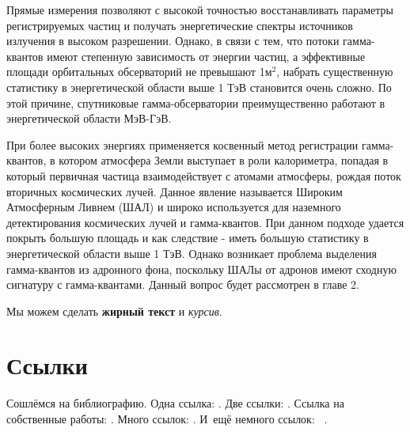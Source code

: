 Прямые измерения позволяют с высокой точностью восстанавливать параметры регистрируемых частиц и получать энергетические спектры источников излучения в высоком разрешении. Однако, в связи с тем, что потоки гамма-квантов имеют степенную зависимость от энергии частиц, а эффективные площади орбитальных обсерваторий не превышают 1$м^2$, набрать существенную статистику в энергетической области выше 1 ТэВ становится очень сложно. По этой причине, спутниковые гамма-обсерватории преимущественно работают в энергетической области МэВ-ГэВ. 

При более высоких энергиях применяется косвенный метод регистрации гамма-квантов, в котором атмосфера Земли выступает в роли калориметра, попадая в который первичная частица взаимодействует с атомами атмосферы, рождая поток вторичных космических лучей. Данное явление называется Широким Атмосферным Ливнем (ШАЛ) и широко используется для наземного детектирования космических лучей и гамма-квантов. При данном подходе удается покрыть большую площадь и как следствие - иметь большую статистику в энергетической области выше 1 ТэВ. Однако возникает проблема выделения гамма-квантов из адронного фона, поскольку ШАЛы от адронов имеют сходную сигнатуру с гамма-квантами. Данный вопрос будет рассмотрен в главе 2. 

Мы можем сделать \textbf{жирный текст} и \textit{курсив}.

\section{Ссылки}\label{sec:ch1/sec3}

Сошлёмся на библиографию.
Одна ссылка: \cite[с.~54]{Sokolov}\cite[с.~36]{Gaidaenko}.
Две ссылки: \cite{Sokolov,Gaidaenko}.
Ссылка на собственные работы: \cite{vakbib1, confbib2}.
Много ссылок: %
\cite{Lermontov, Management, Borozda, Marketing, Constitution, FamilyCode,
    Gost.7.0.53, Razumovski, Lagkueva, Pokrovski, Methodology, Berestova,
    Kriger}%
%
.
И~ещё немного ссылок:~\cite{Article,Book,Booklet,Conference,Inbook,Incollection,Manual,Mastersthesis,
    Misc,Phdthesis,Proceedings,Techreport,Unpublished}
\cite{medvedev2006jelektronnye, CEAT:CEAT581, doi:10.1080/01932691.2010.513279,
    Gosele1999161,Li2007StressAnalysis, Shoji199895, test:eisner-sample,
    test:eisner-sample-shorted, AB_patent_Pomerantz_1968, iofis_patent1960}%
%
.

